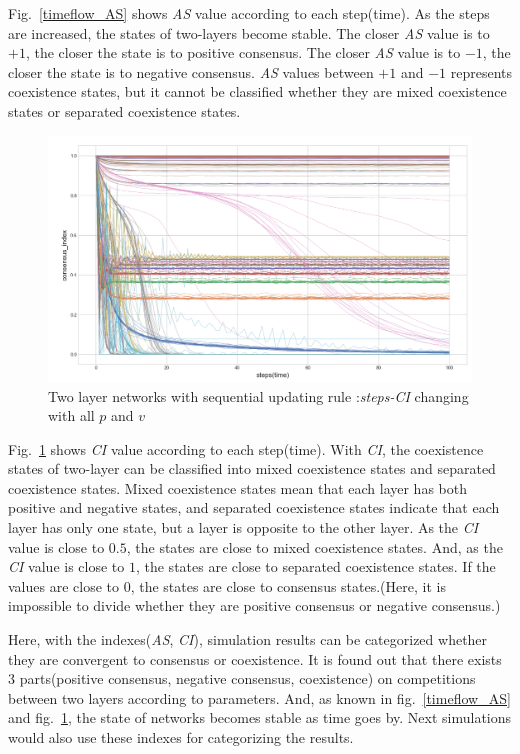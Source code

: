\documentclass[review]{elsarticle}
\begin{document}
Fig.~\ref{timeflow_AS} shows \textit{AS} value according to each step(time). As the steps are increased, the states of two-layers become stable. The closer \textit{AS} value is to $+1$, the closer the state is to positive consensus. The closer \textit{AS} value is to $-1$, the closer the state is to negative consensus. \textit{AS} values between $+1$ and $-1$ represents coexistence states, but it cannot be classified whether they are mixed coexistence states or separated coexistence states.
\begin{figure}[!htb]
	\centering
	\includegraphics[width=\hsize]{timeflow_CI.png}
	\caption{Two layer networks with sequential updating rule :\textit{steps-CI} changing with all $p$ and $v$}
	\label{timeflow_CI}
\end{figure}
Fig.~\ref{timeflow_CI} shows \textit{CI} value according to each step(time). With \textit{CI}, the coexistence states of two-layer can be classified into mixed coexistence states and separated coexistence states. Mixed coexistence states mean that each layer has both positive and negative states, and separated coexistence states indicate that each layer has only one state, but a layer is opposite to the other layer. As the \textit{CI} value is close to $0.5$, the states are close to mixed coexistence states. And, as the \textit{CI} value is close to $1$, the states are close to separated coexistence states. If the values are close to $0$, the states are close to consensus states.(Here, it is impossible to divide whether they are positive consensus or negative consensus.)           

Here, with the indexes(\textit{AS}, \textit{CI}), simulation results can be categorized whether they are convergent to consensus or coexistence. It is found out that there exists 3 parts(positive consensus, negative consensus, coexistence) on competitions between two layers according to parameters. And, as known in fig.~\ref{timeflow_AS} and fig.~\ref{timeflow_CI}, the state of networks becomes stable as time goes by. Next simulations would also use these indexes for categorizing the results. 
\end{document}
